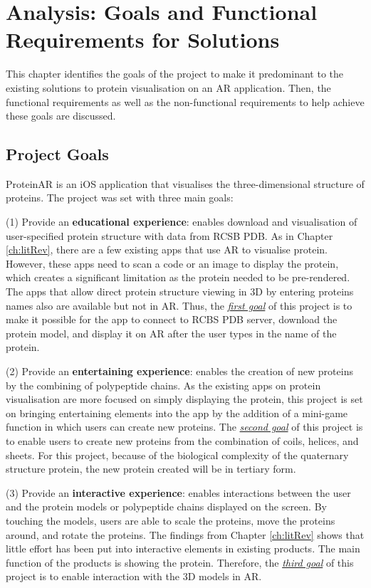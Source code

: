 \chapter{Analysis: Goals and Functional Requirements for Solutions}
\label{ch:analysis2}

This chapter identifies the goals of the project to make it predominant to the existing solutions to protein visualisation on an AR application. Then, the functional requirements as well as the non-functional requirements to help achieve these goals are discussed. 

\section{Project Goals}
ProteinAR is an iOS application that visualises the three-dimensional structure of proteins. The project was set with three main goals:

(1) Provide an \textbf{educational experience}: enables download and visualisation of user-specified protein structure with data from RCSB PDB. As in Chapter \ref{ch:litRev}, there are a few existing apps that use AR to visualise protein. However, these apps need to scan a code or an image to display the protein, which creates a significant limitation as the protein needed to be pre-rendered. The apps that allow direct protein structure viewing in 3D by entering proteins names also are available but not in AR. 
Thus, the \emph{\underline{first goal}} of this project is to make it possible for the app to connect to RCBS PDB server, download the protein model, and display it on AR after the user types in the name of the protein. 

(2) Provide an \textbf{entertaining experience}: enables the creation of new proteins by the combining of polypeptide chains. As the existing apps on protein visualisation are more focused on simply displaying the protein, this project is set on bringing entertaining elements into the app by the addition of a mini-game function in which users can create new proteins. 
The \emph{\underline{second goal}} of this project is to enable users to create new proteins from the combination of coils, helices, and sheets. For this project, because of the biological complexity of the quaternary structure protein, the new protein created will be in tertiary form. 

(3) Provide an \textbf{interactive experience}: enables interactions between the user and the protein models or polypeptide chains displayed on the screen. By touching the models, users are able to scale the proteins, move the proteins around, and rotate the proteins. The findings from Chapter \ref{ch:litRev} shows that little effort has been put into interactive elements in existing products. The main function of the products is showing the protein. Therefore, the  \emph{\underline{third goal}} of this project is to enable interaction with the 3D models in AR.


